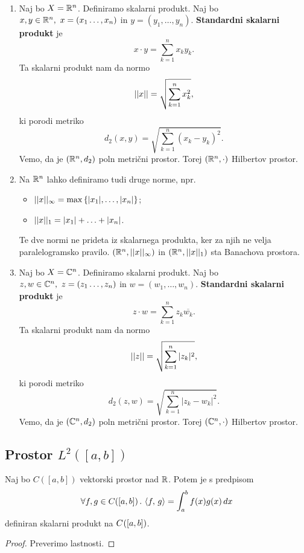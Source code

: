 \newpage
\begin{zgled} \
\begin{enumerate}
    \item Naj bo \(X = \mathbb{R}^n\). Definiramo skalarni produkt. Naj bo \(x, y \in \mathbb{R}^n, \ x = (x_1 \ldots, x_n)\) in \(y = (y_1, \ldots, y_n)\). \textbf{Standardni skalarni produkt} je \[x \cdot y = \sum_{k=1}^{n} x_ky_k.\]
    Ta skalarni produkt nam da normo \[||x|| = \sqrt{\sum_{k=1}^{n} x_k^2},\]
    ki porodi metriko \[d_2(x,y) = \sqrt{\sum_{k=1}^{n} (x_k - y_k)^2}.\]
    Vemo, da je \((\mathbb{R}^n, d_2)\) poln metrični prostor. Torej \((\mathbb{R}^n, \cdot)\) Hilbertov prostor.
    \item Na \(\mathbb{R}^n\) lahko definiramo tudi druge norme, npr.
    \begin{itemize}
        \item \(||x||_\infty = \max \left\{|x_1|, \ldots, |x_n|\right\}\);
        \item \(||x||_1 = |x_1| + \ldots + |x_n|\). 
    \end{itemize}
    Te dve normi ne prideta iz skalarnega produkta, ker za njih ne velja paralelogramsko pravilo.
    \((\mathbb{R}^n, ||x||_\infty)\) in \((\mathbb{R}^n, ||x||_1)\) sta Banachova prostora.
    \item Naj bo \(X = \mathbb{C}^n\). Definiramo skalarni produkt. Naj bo \(z, w \in \mathbb{C}^n, \ z = (z_1 \ldots, z_n)\) in \(w = (w_1, \ldots, w_n)\). \textbf{Standardni skalarni produkt} je \[z \cdot w = \sum_{k=1}^{n} z_k\overline{w_k}.\]
    Ta skalarni produkt nam da normo \[||z|| = \sqrt{\sum_{k=1}^{n} |z_k|^2},\]
    ki porodi metriko \[d_2(z,w) = \sqrt{\sum_{k=1}^{n} |z_k - w_k|^2}.\]
    Vemo, da je \((\mathbb{C}^n, d_2)\) poln metrični prostor. Torej \((\mathbb{C}^n, \cdot)\) Hilbertov prostor.
\end{enumerate}
\end{zgled}

\subsection{Prostor \(L^2([a, b])\)}
\begin{trditev}
    Naj bo \(C([a,b])\) vektorski prostor nad \(\mathbb{R}\). Potem je s predpisom \[\forall f, g \in C([a,b]) \,.\, \left\langle f, \, g \right\rangle = \int_{a}^{b} f(x) g(x) \, dx\]
    definiran skalarni produkt na \(C^{}([a,b])\).
\end{trditev}

\begin{proof}
    Preverimo lastnosti.
\end{proof}

